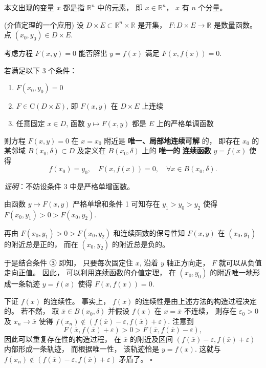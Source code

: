 

本文出现的变量 $x$ 都是指 $\mathbb{R}^n$ 中的元素， 即 $x\in\mathbb{R}^n$， $x$ 有 $n$ 个分量。

\begin{theorem}{(介值定理的一个应用)}\label{impli_the1}
设 $D\times E\subset\mathbb{R}^{n}\times\mathbb{R}$ 是开集，
$F:D\times E\rightarrow\mathbb{R}$ 是数量函数。 点 $(x_{0},y_{0})\in D\times E.$ 

考虑方程 $F(x,y)=0$ 能否解出 $y=f(x)$ 满足 $F(x,f(x))=0.$ 

若满足以下 3 个条件：

\begin{enumerate}
\item $F(x_{0},y_{0})=0$
\item $F\in\mathrm{C}(D\times E)$, 即 $F(x,y)$ 在 $D\times E$ 上连续
\item 任意固定 $x\in D$, 函数 $y\mapsto F(x,y)$ 都是 $E$ 上的严格单调函数
\end{enumerate}

则方程 $F(x,y)=0$ 在 $x=x_{0}$ 附近是\textbf{ 唯一、局部地连续可解} 的， 即存在 $x_{0}$
的某邻域 $B(x_{0},\delta)\subset D$ 及定义在 $B(x_{0},\delta)$ 上的 \textbf{唯一的}\textbf{
连续函数} $y=f(x)$ 使得
\[
f(x_{0})=y_{0},\quad F(x,f(x))=0,\quad\forall x\in B(x_{0},\delta).
\]
\end{theorem}

\textsl{证明}：不妨设条件 3 中是严格单增函数。 

由函数 $y\mapsto F(x,y)$ 严格单增和条件 1 可知存在 $y_{1}>y_{0}>y_{2}$ 使得 $F(x_{0},y_{1})>0>F(x_{0},y_{2})$. 

再由 $F(x_{0},y_{1})>0>F(x_{0},y_{2})$ 和连续函数的保号性知 $F(x,y)$ 在 $(x_{0},y_{1})$
的附近总是正的， 而在 $(x_{0},y_{2})$ 的附近总是负的。 

于是结合条件 ③ 即知， 只要每次固定住 $x$, 沿着 $y$ 轴正方向走， $F$ 就可以从负值走向正值。 因此， 可以利用连续函数的介值定理，
在 $(x_{0},y_{0})$ 的附近唯一地形成一条轨迹 $y=f(x)$ 使得 $F(x,f(x))=0$. 

下证 $f(x)$ 的连续性。 事实上， $f(x)$ 的连续性是由上述方法的构造过程决定的。 若不然， 取 $\overline{x}\in B(x_0,\delta)$ 并假设 $f(x)$ 在
$x=\overline{x}$ 不连续， 则存在 $\varepsilon_{0}>0$ 及 $x_{n}\rightarrow\overline{x}$
使得 $f(x_{n})\notin(f(\overline{x})-\varepsilon,f(\overline{x})+\varepsilon)$.
注意到
\[
F(\overline{x},f(\overline{x})+\varepsilon)>0>F(\overline{x},f(\overline{x})-\varepsilon),
\]
因此可以重复存在性的构造过程， 在 \textbf{$\overline{x}$ }的附近及区间 $(f(\overline{x})-\varepsilon,f(\overline{x})+\varepsilon)$
内部形成一条轨迹， 而根据唯一性， 该轨迹恰是 $y=f(x)$. 这就与 $f(x_{n})\notin(f(\overline{x})-\varepsilon,f(\overline{x})+\varepsilon)$
矛盾了。 $\square$ 

